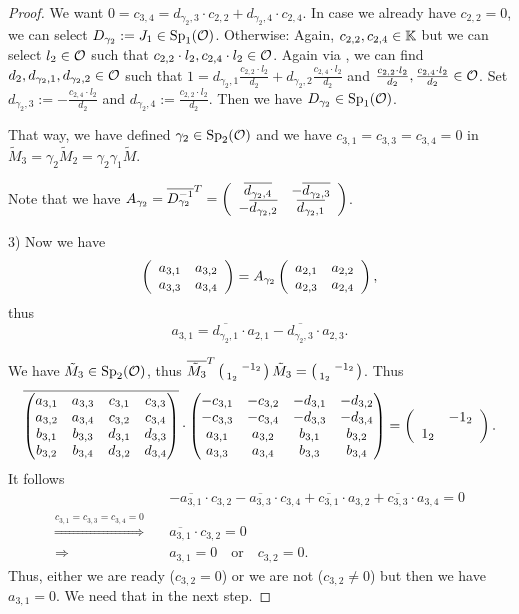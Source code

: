 \begin{lemma}[$solveR$]
\begin{proof}
We want $0 = c_{3,4} = d_{\gamma_2,3} \cdot c_{2,2} + d_{\gamma_2,4} \cdot c_{2,4}$. In case we already have $c_{2,2} = 0$, we can select $D_{\gamma_2} := J_1 \in \operatorname{Sp}_1(\mathcal{O})$. Otherwise: Again, $c_{2,2}, c_{2,4} \in \mathbb{K}$ but we can select $l_2 \in \mathcal{O}$ such that $c_{2,2} \cdot l_2, c_{2,4} \cdot l_2 \in \mathcal{O}$. Again via , we can find $d_2,d_{\gamma_2,1},d_{\gamma_2,2} \in \mathcal{O}$ such that $1 = d_{\gamma_2,1} \frac{c_{2,2} \cdot l_2}{d_2} + d_{\gamma_2,2} \frac{c_{2,4} \cdot l_2}{d_2}$ and $\frac{c_{2,2} \cdot l_2}{d_2}, \frac{c_{2,4} \cdot l_2}{d_2} \in \mathcal{O}$. Set $d_{\gamma_2,3} := -\frac{c_{2,4}\cdot l_2}{d_2}$ and $d_{\gamma_2,4} := \frac{c_{2,2} \cdot l_2}{d_2}$. Then we have $D_{\gamma_2} \in \operatorname{Sp}_1(\mathcal{O})$.

That way, we have defined $\gamma_2 \in \operatorname{Sp}_2(\mathcal{O})$ and we have $c_{3,1} = c_{3,3} = c_{3,4} = 0$ in $\tilde{M}_3 = \gamma_2 \tilde{M}_2 = \gamma_2 \gamma_1 \tilde{M}$.

Note that we have $A_{\gamma_2} = \overline{D_{\gamma_2}^{-1}}^T = \left( \begin{array}{cc} \overline{d_{\gamma_2,4}} & -\overline{d_{\gamma_2,3}} \\ -\overline{d_{\gamma_2,2}} & \overline{d_{\gamma_2,1}} \end{array} \right)$.

3) Now we have
\[ \left( \begin{array}{cc} a_{3,1} & a_{3,2} \\ a_{3,3} & a_{3,4} \end{array} \right) = A_{\gamma_2} \left( \begin{array}{cc} a_{2,1} & a_{2,2} \\ a_{2,3} & a_{2,4} \end{array} \right) , \]
thus
\[ a_{3,1} = \overline{d_{\gamma_2,1}} \cdot a_{2,1} - \overline{d_{\gamma_2,3}} \cdot a_{2,3} . \]

We have $\tilde{M}_3 \in \operatorname{Sp}_2(\mathcal{O})$, thus $\overline{\tilde{M}_3}^T \left( \begin{smallmatrix}  & -1_2 \\ 1_2 &  \end{smallmatrix} \right) \tilde{M}_3 = \left( \begin{smallmatrix}  & -1_2 \\ 1_2 &  \end{smallmatrix} \right)$. Thus
\[ \overline{\begin{pmatrix}
a_{3,1} & a_{3,3} & c_{3,1} & c_{3,3} \\
a_{3,2} & a_{3,4} & c_{3,2} & c_{3,4} \\
b_{3,1} & b_{3,3} & d_{3,1} & d_{3,3} \\
b_{3,2} & b_{3,4} & d_{3,2} & d_{3,4}
\end{pmatrix}} \cdot \begin{pmatrix}
-c_{3,1} & -c_{3,2} & -d_{3,1} & -d_{3,2} \\
-c_{3,3} & -c_{3,4} & -d_{3,3} & -d_{3,4} \\
a_{3,1} & a_{3,2} & b_{3,1} & b_{3,2} \\
a_{3,3} & a_{3,4} & b_{3,3} & b_{3,4}
\end{pmatrix} = \left( \begin{array}{cc}  & -1_2 \\ 1_2 &  \end{array} \right) .
 \]
It follows
\[
\begin{array}{cl}
& - \overline{a_{3,1}} \cdot c_{3,2} - \overline{a_{3,3}} \cdot c_{3,4} + \overline{c_{3,1}} \cdot a_{3,2} + \overline{c_{3,3}} \cdot a_{3,4} = 0 \\
\overset{c_{3,1}=c_{3,3}=c_{3,4}=0}{\Longrightarrow}\quad & \overline{a_{3,1}} \cdot c_{3,2} = 0 \\
\Longrightarrow \quad & a_{3,1} = 0 \quad \text{or} \quad c_{3,2} = 0 .
\end{array}
\]
Thus, either we are ready ($c_{3,2} = 0$) or we are not ($c_{3,2} \ne 0$) but then we have $a_{3,1} = 0$. We need that in the next step.


\end{proof}
\end{lemma}

